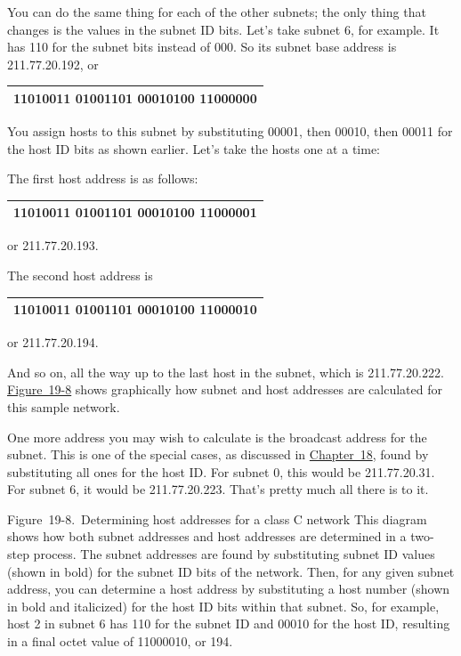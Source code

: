 \documentclass[b5paper,11pt]{memoir}
\begin{document}
You can do the same thing for each of the other subnets; the only thing
that changes is the values in the subnet ID bits. Let's take subnet 6,
for example. It has 110 for the subnet bits instead of 000. So its
subnet base address is 211.77.20.192, or

\begin{longtable}[]{@{}l@{}}
\toprule
\endhead
11010011 01001101 00010100 {\textbf{110}}{00000}\tabularnewline
\bottomrule
\end{longtable}

You assign hosts to this subnet by substituting 00001, then 00010, then
00011 for the host ID bits as shown earlier. Let's take the hosts one at
a time:

The first host address is as follows:

\begin{longtable}[]{@{}l@{}}
\toprule
\endhead
11010011 01001101 00010100 {\textbf{110}}{00001}\tabularnewline
\bottomrule
\end{longtable}

or 211.77.20.193.

The second host address is

\begin{longtable}[]{@{}l@{}}
\toprule
\endhead
11010011 01001101 00010100 {\textbf{110}}{00010}\tabularnewline
\bottomrule
\end{longtable}

or 211.77.20.194.

And so on, all the way up to the last host in the subnet, which is
211.77.20.222.
\protect\hyperlink{ch19s05.htmlux5cux23determining_host_addresses_for_a_class_c}{Figure~19-8}
shows graphically how subnet and host addresses are calculated for this
sample network.

One more address you may wish to calculate is the broadcast address for
the subnet. This is one of the special cases, as discussed in
\protect\hyperlink{ch18.html}{Chapter~18}, found by substituting all
ones for the host ID. For subnet 0, this would be 211.77.20.31. For
subnet 6, it would be 211.77.20.223. That's pretty much all there is to
it.

\protect\hypertarget{ch19s05.htmlux5cux23determining_host_addresses_for_a_class_c}{}{}

\protect\hypertarget{ch19s05.htmlux5cux23I_mediaobject5_d1e21218}{}{}

Figure~19-8.~Determining host addresses for a class C network This
diagram shows how both subnet addresses and host addresses are
determined in a two-step process. The subnet addresses are found by
substituting subnet ID values (shown in bold) for the subnet ID bits of
the network. Then, for any given subnet address, you can determine a
host address by substituting a host number (shown in bold and
italicized) for the host ID bits within that subnet. So, for example,
host 2 in subnet 6 has 110 for the subnet ID and 00010 for the host ID,
resulting in a final octet value of 11000010, or 194.
\end{document}
